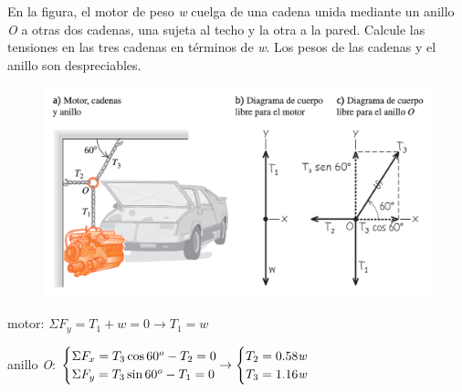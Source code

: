 \begin{prob}
	En la figura, el motor de peso \textit{w} cuelga de una cadena unida mediante un anillo \textit{O} a otras dos cadenas, una sujeta al techo y la otra a la pared. Calcule las tensiones en las tres cadenas en términos de \textit{w}. Los pesos de las cadenas y el anillo son despreciables.
\end{prob}
	\begin{figure}[H]
	\centering
	\includegraphics[width=1\textwidth]{imagenes/imagenes03/T03IM38.png}
	\end{figure}

motor: $\Sigma F_y=T_1+\textit{w}=0 \to T_1=\textit{w}$

anillo \textit{O}: $\begin{cases}
\Sigma F_x=T_3 \cos 60^o-T_2=0 \\ \Sigma F_y=T_3 \sin 60^o-T_1=0	
\end{cases} \hspace{-4mm} \to  \begin{cases}
 T_2=0.58 \textit{w} \\ T_3=1.16 \textit{w}	
\end{cases}$

